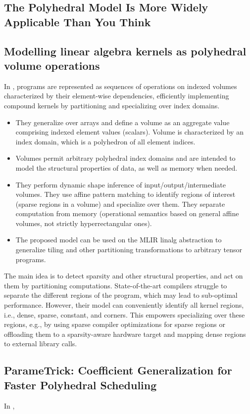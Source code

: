 \documentclass[a4paper, 11pt]{article}
\begin{document}
\subsection{The Polyhedral Model Is More Widely Applicable Than You Think}
\cite{Benabderrahmane2010ThePM}

\subsection{Modelling linear algebra kernels as polyhedral volume operations}
In \cite{friebel2022modelling}, programs are represented as sequences of operations on indexed volumes characterized by their element-wise dependencies, efficiently implementing compound kernels by partitioning and specializing over index domains.
\begin{itemize}
    \item They generalize over arrays and define a volume as an aggregate value comprising indexed element values (scalars). Volume is characterized by an index domain, which is a polyhedron of all element indices.
    \item Volumes permit arbitrary polyhedral index domains and are intended to model the structural properties of data, as well as memory when needed.
    \item They perform dynamic shape inference of input/output/intermediate volumes. They use affine pattern matching to identify regions of interest (sparse regions in a volume) and specialize over them. They separate computation from memory (operational semantics based on general affine volumes, not strictly hyperrectangular ones).
    \item The proposed model can be used on the MLIR linalg abstraction to generalize tiling and other partitioning transformations to arbitrary tensor programs.
\end{itemize}
The main idea is to detect sparsity and other structural properties, and act on them by partitioning computations. State-of-the-art compilers struggle to separate the different regions of the program, which may lead to sub-optimal performance. However, their model can conveniently identify all kernel regions, i.e., dense, sparse, constant, and corners. This empowers specializing over these regions, e.g., by using sparse compiler optimizations for sparse regions or offloading them to a sparsity-aware hardware target and mapping dense regions to external library calls.

\subsection{ParameTrick: Coefficient Generalization for Faster Polyhedral Scheduling}
In \cite{consolaro24-parametrick}, 
\end{document}
